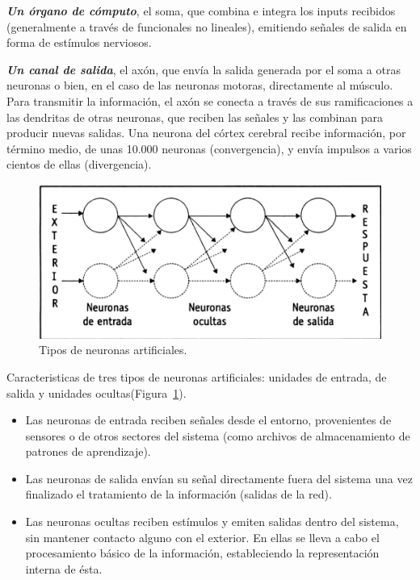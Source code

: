 \textbf{\textit{Un órgano de cómputo}}, el soma, que combina e integra los inputs recibidos (generalmente a través de funcionales no lineales), emitiendo señales de salida en forma de estímulos nerviosos.

\textbf{\textit{Un canal de salida}}, el axón, que envía la salida generada por el soma a
otras neuronas o bien, en el caso de las neuronas motoras, directamente al
músculo. Para transmitir la información, el axón se conecta a través de sus ramificaciones a las dendritas de otras neuronas, que reciben las señales y las combinan para producir nuevas salidas. Una neurona del córtex cerebral recibe información, por término medio, de unas 10.000 neuronas (convergencia), y envía impulsos a varios cientos de ellas (divergencia).

\begin{figure}[H]
  \begin{center}
    \includegraphics[scale=0.90]{./tipo_neuronas.png}
    \caption{Tipos de neuronas artificiales\cite{lopez2008redes}.}
    \label{fig:tipo}
  \end{center}
\end{figure}

Caracteristicas de tres tipos de neuronas artificiales:
unidades de entrada, de salida y unidades ocultas(Figura~\ref{fig:tipo})\cite{lopez2008redes}.

\begin{itemize}
\item  Las neuronas de entrada reciben señales desde el entorno, provenientes de sensores o de otros sectores del sistema (como archivos de almacenamiento de patrones de aprendizaje).

\item Las neuronas de salida envían su señal directamente fuera del sistema una vez finalizado el tratamiento de la información (salidas de la red).

\item Las neuronas ocultas reciben estímulos y emiten salidas dentro del sistema, sin mantener contacto alguno con el exterior. En ellas se lleva a cabo el procesamiento básico de la información, estableciendo la representación
interna de ésta.
\end{itemize}

